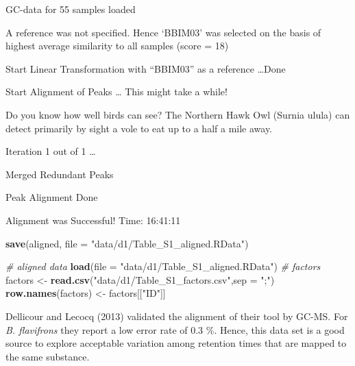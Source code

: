 \documentclass[]{article}
\newenvironment{Shaded}{}{}
\newcommand{\KeywordTok}[1]{\textbf{{#1}}}
\newcommand{\DataTypeTok}[1]{\textcolor[rgb]{0.50,0.00,0.00}{{#1}}}
\newcommand{\StringTok}[1]{\textcolor[rgb]{0.87,0.00,0.00}{{#1}}}
\newcommand{\CommentTok}[1]{\textcolor[rgb]{0.50,0.50,0.50}{\textit{{#1}}}}
\newcommand{\NormalTok}[1]{{#1}}
\begin{document}
GC-data for 55 samples loaded

A reference was not specified. Hence `BBIM03' was selected on the basis
of highest average similarity to all samples (score = 18)

Start Linear Transformation with ``BBIM03'' as a reference \ldots{}Done

Start Alignment of Peaks \ldots{} This might take a while!

Do you know how well birds can see? The Northern Hawk Owl (Surnia ulula)
can detect primarily by sight a vole to eat up to a half a mile away.

Iteration 1 out of 1 \ldots{}

Merged Redundant Peaks

Peak Alignment Done

Alignment was Successful! Time: 16:41:11

\begin{Shaded}
\begin{Highlighting}[]
\KeywordTok{save}\NormalTok{(aligned, }\DataTypeTok{file =} \StringTok{"data/d1/Table_S1_aligned.RData"}\NormalTok{)}
\end{Highlighting}
\end{Shaded}

\begin{Shaded}
\begin{Highlighting}[]
\CommentTok{# aligned data}
\KeywordTok{load}\NormalTok{(}\DataTypeTok{file =} \StringTok{"data/d1/Table_S1_aligned.RData"}\NormalTok{)}
\CommentTok{# factors}
\NormalTok{factors <-}\StringTok{ }\KeywordTok{read.csv}\NormalTok{(}\StringTok{"data/d1/Table_S1_factors.csv"}\NormalTok{,}\DataTypeTok{sep =} \StringTok{";"}\NormalTok{)}
\KeywordTok{row.names}\NormalTok{(factors) <-}\StringTok{ }\NormalTok{factors[[}\StringTok{"ID"}\NormalTok{]]}
\end{Highlighting}
\end{Shaded}

Dellicour and Lecocq (2013) validated the alignment of their tool by
GC-MS. For \emph{B. flavifrons} they report a low error rate of 0.3 \%.
Hence, this data set is a good source to explore acceptable variation
among retention times that are mapped to the same substance.
\end{document}
